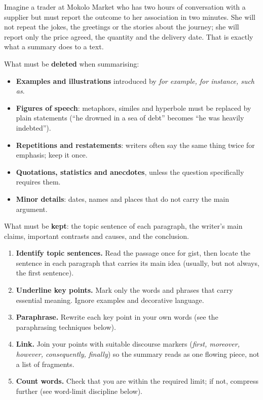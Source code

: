 \documentclass[11pt]{article}
\begin{document}
Imagine a trader at Mokolo Market who has two hours of conversation with a supplier but must report the outcome to her association in two minutes. She will not repeat the jokes, the greetings or the stories about the journey; she will report only the price agreed, the quantity and the delivery date. That is exactly what a summary does to a text.

What must be \textbf{deleted} when summarising:
\begin{itemize}
\item \textbf{Examples and illustrations} introduced by \emph{for example, for instance, such as}.
\item \textbf{Figures of speech}: metaphors, similes and hyperbole must be replaced by plain statements (``he drowned in a sea of debt'' becomes ``he was heavily indebted'').
\item \textbf{Repetitions and restatements}: writers often say the same thing twice for emphasis; keep it once.
\item \textbf{Quotations, statistics and anecdotes}, unless the question specifically requires them.
\item \textbf{Minor details}: dates, names and places that do not carry the main argument.
\end{itemize}

What must be \textbf{kept}: the topic sentence of each paragraph, the writer's main claims, important contrasts and causes, and the conclusion.

\begin{methode}
\begin{enumerate}
\item \textbf{Identify topic sentences.} Read the passage once for gist, then locate the sentence in each paragraph that carries its main idea (usually, but not always, the first sentence).
\item \textbf{Underline key points.} Mark only the words and phrases that carry essential meaning. Ignore examples and decorative language.
\item \textbf{Paraphrase.} Rewrite each key point in your own words (see the paraphrasing techniques below).
\item \textbf{Link.} Join your points with suitable discourse markers (\emph{first, moreover, however, consequently, finally}) so the summary reads as one flowing piece, not a list of fragments.
\item \textbf{Count words.} Check that you are within the required limit; if not, compress further (see word-limit discipline below).
\end{enumerate}
\end{methode}
\end{document}

